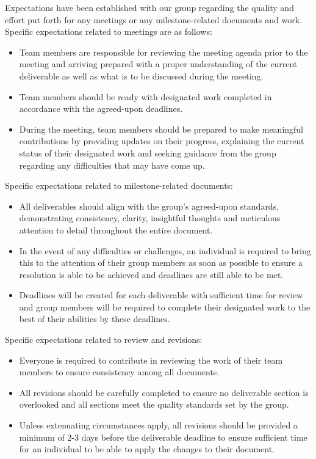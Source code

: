 \documentclass{article}
\begin{document}
Expectations have been established with our group regarding the quality and effort put forth for any meetings or any
milestone-related documents and work.\\

Specific expectations related to meetings are as follows:
\begin{itemize}
    \item Team members are responsible for reviewing the meeting agenda prior to the meeting and arriving prepared
    with a proper understanding of the current deliverable as well as what is to be discussed during the meeting.
    \item Team members should be ready with designated work completed in accordance with the agreed-upon deadlines.
    \item During the meeting, team members should be prepared to make meaningful contributions by providing updates
    on their progress, explaining the current status of their designated work and seeking guidance from the group
    regarding any  difficulties that may have come up.
\end{itemize}

Specific expectations related to milestone-related documents:
\begin{itemize}
    \item All deliverables should align with the group’s agreed-upon standards, demonstrating consistency, clarity,
    insightful thoughts and meticulous attention to detail throughout the entire document.
    \item In the event of any difficulties or challenges, an individual is required to bring this to the attention
    of their group members as soon as possible to ensure a resolution is able to be achieved and deadlines are still able to be met.
    \item Deadlines will be created for each deliverable with sufficient time for review and group members will be
    required to complete their designated work to the best of their abilities by these deadlines.
\end{itemize}

Specific expectations related to review and revisions:
\begin{itemize}
    \item Everyone is required to contribute in reviewing the work of their team members to ensure consistency among
    all documents.
    \item All revisions should be carefully completed to ensure no deliverable section is overlooked and all
    sections meet the quality standards set by the group.
    \item Unless extenuating circumstances apply, all revisions should be provided a minimum of 2-3 days before the
    deliverable deadline to ensure sufficient time for an individual to be able to apply the changes to their document.
\end{itemize}
\end{document}
